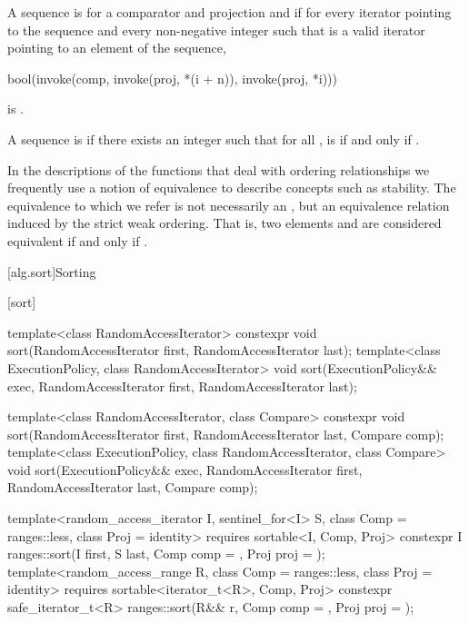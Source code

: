 \pnum
A sequence is 
for a comparator and projection  and 
if for every iterator  pointing to the sequence and
every non-negative integer 
such that  is a valid iterator
pointing to an element of the sequence,
\begin{codeblock}
bool(invoke(comp, invoke(proj, *(i + n)), invoke(proj, *i)))
\end{codeblock}
is .

\pnum
A sequence  is
 
if there exists an integer 
such that for all ,
 is  if and only if .

\pnum
In the descriptions of the functions that deal with ordering relationships
we frequently use a notion of equivalence to describe concepts
such as stability.
The equivalence to which we refer is not necessarily an ,
but an equivalence relation induced by the strict weak ordering.
That is, two elements  and  are considered equivalent
if and only if .

[alg.sort]{Sorting}

[sort]{}

%
\begin{itemdecl}
template<class RandomAccessIterator>
  constexpr void sort(RandomAccessIterator first, RandomAccessIterator last);
template<class ExecutionPolicy, class RandomAccessIterator>
  void sort(ExecutionPolicy&& exec,
            RandomAccessIterator first, RandomAccessIterator last);

template<class RandomAccessIterator, class Compare>
  constexpr void sort(RandomAccessIterator first, RandomAccessIterator last,
                      Compare comp);
template<class ExecutionPolicy, class RandomAccessIterator, class Compare>
  void sort(ExecutionPolicy&& exec,
            RandomAccessIterator first, RandomAccessIterator last,
            Compare comp);

template<random_access_iterator I, sentinel_for<I> S, class Comp = ranges::less,
         class Proj = identity>
  requires sortable<I, Comp, Proj>
  constexpr I
    ranges::sort(I first, S last, Comp comp = {}, Proj proj = {});
template<random_access_range R, class Comp = ranges::less, class Proj = identity>
  requires sortable<iterator_t<R>, Comp, Proj>
  constexpr safe_iterator_t<R>
    ranges::sort(R&& r, Comp comp = {}, Proj proj = {});
\end{itemdecl}

